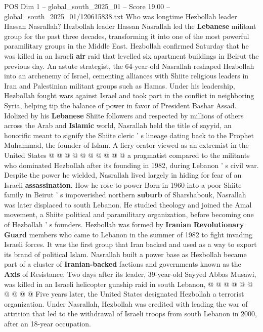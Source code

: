 \begin{textsample}{POS Dim 1 – global\_south\_2025\_01 – Score 19.00 – global\_south\_2025\_01/120615838.txt}  \label{ex:f1_pos_306}
Who was longtime Hezbollah leader Hassan Nasrallah?
Hezbollah leader Hassan Nasrallah led the \textbf{Lebanese} militant group for the past three decades, transforming it into one of the most powerful paramilitary groups in the Middle East.
Hezbollah confirmed Saturday that he was killed in an Israeli \textbf{air} raid that levelled six apartment buildings in Beirut the previous day.
An astute strategist, the 64-year-old Nasrallah reshaped Hezbollah into an archenemy of Israel, cementing alliances with Shiite religious leaders in Iran and Palestinian militant groups such as Hamas.
Under his leadership, Hezbollah fought wars against Israel and took part in the conflict in neighboring Syria, helping tip the balance of power in favor of President Bashar Assad.
Idolized by his \textbf{Lebanese} Shiite followers and respected by millions of others across the Arab and \textbf{Islamic} world, Nasrallah held the title of sayyid, an honorific meant to signify the Shiite cleric ' s lineage dating back to the Prophet Muhammad, the founder of Islam.
A fiery orator viewed as an extremist in the United States @ @ @ @ @ @ @ @ @ @ a pragmatist compared to the militants who dominated Hezbollah after its founding in 1982, during Lebanon ' s civil war.
Despite the power he wielded, Nasrallah lived largely in hiding for fear of an Israeli \textbf{assassination}.
How he rose to power Born in 1960 into a poor Shiite family in Beirut ' s impoverished northern \textbf{suburb} of Sharshabouk, Nasrallah was later displaced to south Lebanon.
He studied theology and joined the Amal movement, a Shiite political and paramilitary organization, before becoming one of Hezbollah ' s founders.
Hezbollah was formed by \textbf{Iranian} \textbf{Revolutionary} \textbf{Guard} members who came to Lebanon in the summer of 1982 to fight invading Israeli forces.
It was the first group that Iran backed and used as a way to export its brand of political Islam.
Nasrallah built a power base as Hezbollah became part of a cluster of \textbf{Iranian-backed} factions and governments known as the \textbf{Axis} of Resistance.
Two days after its leader, 39-year-old Sayyed Abbas Musawi, was killed in an Israeli helicopter gunship raid in south Lebanon, @ @ @ @ @ @ @ @ @ @ Five years later, the United States designated Hezbollah a terrorist organization.
Under Nasrallah, Hezbollah was credited with leading the war of attrition that led to the withdrawal of Israeli troops from south Lebanon in 2000, after an 18-year occupation.

\end{textsample}
